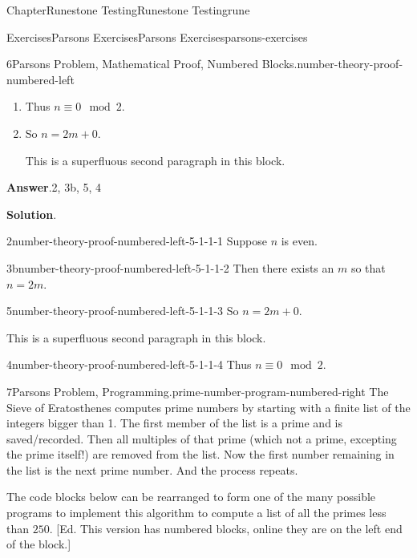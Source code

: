 \documentclass[oneside,10pt,]{book}
\newcommand{\blocktitlefont}{\relax}
\numberwithin{equation}{section}
\begin{document}
\begin{chapterptx}{Chapter}{Runestone Testing}{}{Runestone Testing}{}{}{rune}
\begin{exercises-section}{Exercises}{Parsons Exercises}{}{Parsons Exercises}{}{}{parsons-exercises}
\begin{divisionexercise}{6}{Parsons Problem, Mathematical Proof, Numbered Blocks.}{}{number-theory-proof-numbered-left}
\begin{enumerate}[label={\arabic*.}]
\begin{enumerate}[label={(\alph*)}]
\end{enumerate}
%
\item{}Thus \(n\equiv 0\mod 2\).%
\item{}So \(n = 2m + 0\).%
\par
This is a superfluous second paragraph in this block.%
\end{enumerate}
%
\par\smallskip%
\noindent\textbf{\blocktitlefont Answer}.\hypertarget{number-theory-proof-numbered-left-4}{}\quad{}2, 3b, 5, 4%
\par\smallskip%
\noindent\textbf{\blocktitlefont Solution}.\hypertarget{number-theory-proof-numbered-left-5}{}\quad{}%
\begin{descriptionlist}
\begin{dlinarrow}{2}{number-theory-proof-numbered-left-5-1-1-1}%
Suppose \(n\) is even.%
\end{dlinarrow}%
\begin{dlinarrow}{3b}{number-theory-proof-numbered-left-5-1-1-2}%
Then there exists an \(m\) so that \(n = 2m\).%
\end{dlinarrow}%
\begin{dlinarrow}{5}{number-theory-proof-numbered-left-5-1-1-3}%
So \(n = 2m + 0\).%
\par
This is a superfluous second paragraph in this block.%
\end{dlinarrow}%
\begin{dlinarrow}{4}{number-theory-proof-numbered-left-5-1-1-4}%
Thus \(n\equiv 0\mod 2\).%
\end{dlinarrow}%
\end{descriptionlist}
%
\end{divisionexercise}%
\begin{divisionexercise}{7}{Parsons Problem, Programming.}{}{prime-number-program-numbered-right}%
%
%
The Sieve of Eratosthenes computes prime numbers by starting with a finite list of the integers bigger than 1.  The first member of the list is a prime and is saved\slash{}recorded.  Then all multiples of that prime (which not a prime, excepting the prime itself!) are removed from the list.  Now the first number remaining in the list is the next prime number.  And the process repeats.%
\par
The code blocks below can be rearranged to form one of the many possible programs to implement this algorithm to compute a list of all the primes less than \(250\). [Ed.  This version has numbered blocks, online they are on the left end of the block.]%

\end{divisionexercise}
\end{exercises-section}
\end{chapterptx}
\end{document}
